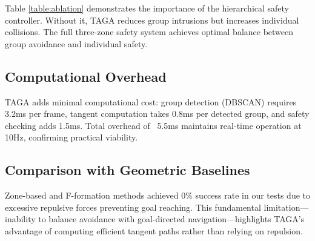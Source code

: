 Table \ref{table:ablation} demonstrates the importance of the hierarchical safety controller. Without it, TAGA reduces group intrusions but increases individual collisions. The full three-zone safety system achieves optimal balance between group avoidance and individual safety.

\subsection{Computational Overhead}
TAGA adds minimal computational cost: group detection (DBSCAN) requires 3.2ms per frame, tangent computation takes 0.8ms per detected group, and safety checking adds 1.5ms. Total overhead of ~5.5ms maintains real-time operation at 10Hz, confirming practical viability.

\subsection{Comparison with Geometric Baselines}
Zone-based and F-formation methods achieved 0\% success rate in our tests due to excessive repulsive forces preventing goal reaching. This fundamental limitation—inability to balance avoidance with goal-directed navigation—highlights TAGA's advantage of computing efficient tangent paths rather than relying on repulsion.



